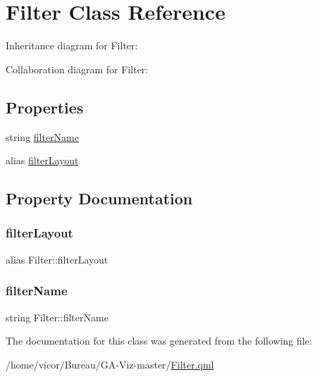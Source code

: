 \hypertarget{class_filter}{}\section{Filter Class Reference}
\label{class_filter}


Inheritance diagram for Filter\+:


Collaboration diagram for Filter\+:
\subsection*{Properties}
\begin{DoxyCompactItemize}
\item 
string \hyperlink{class_filter_a56d19915fd87312c6283e73b19822782}{filter\+Name}
\item 
alias \hyperlink{class_filter_a839ce5abc0ad5732da32a1f9276bc50c}{filter\+Layout}
\end{DoxyCompactItemize}


\subsection{Property Documentation}
\mbox{\label{class_filter_a839ce5abc0ad5732da32a1f9276bc50c}} 
\subsubsection{\texorpdfstring{filter\+Layout}{filterLayout}}
{\footnotesize\ttfamily alias Filter\+::filter\+Layout}

\mbox{\label{class_filter_a56d19915fd87312c6283e73b19822782}} 
\subsubsection{\texorpdfstring{filter\+Name}{filterName}}
{\footnotesize\ttfamily string Filter\+::filter\+Name}



The documentation for this class was generated from the following file\+:\begin{DoxyCompactItemize}
\item 
/home/vicor/\+Bureau/\+G\+A-\/\+Viz-\/master/\hyperlink{_filter_8qml}{Filter.\+qml}\end{DoxyCompactItemize}
